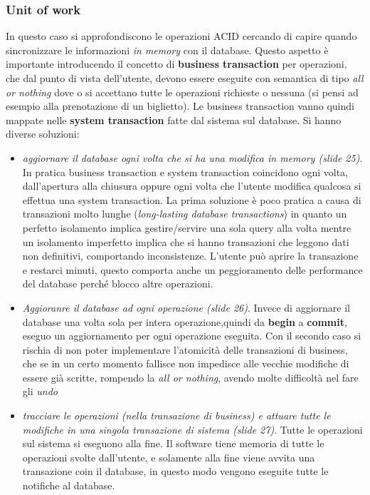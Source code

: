 \subsubsection{Unit of work}
In questo caso si approfondiscono le operazioni ACID cercando di capire quando sincronizzare le informazioni \textit{in memory} con il database. Questo aspetto è importante introducendo il concetto di \textbf{business transaction} per operazioni, che dal punto di vista dell'utente, devono essere eseguite con semantica di tipo \textit{all or nothing} dove o si accettano tutte le operazioni richieste o nessuna (si pensi ad esempio alla prenotazione di un biglietto). Le business transaction vanno quindi mappate nelle \textbf{system transaction} fatte dal sistema sul database. Si hanno diverse soluzioni:
\begin{itemize}
    \item \textit{aggiornare il database ogni volta che si ha una modifica in memory (slide 25)}. In pratica business transaction e system transaction coincidono ogni volta, dall'apertura alla chiusura oppure ogni volta che l'utente modifica qualcosa si effettua una system transaction. La prima soluzione è poco pratica a causa di transazioni molto lunghe (\textit{long-lasting database transactions}) in quanto un perfetto isolamento implica gestire/servire una sola query alla volta mentre un isolamento imperfetto implica che si hanno transazioni che leggono dati non definitivi, comportando inconsistenze. L'utente può aprire la transazione e restarci minuti, questo comporta anche un peggioramento delle performance del database perché blocco altre operazioni.
    \item \textit{Aggioranre il database ad ogni operazione (slide 26)}. Invece di aggiornare il database una volta sola per intera operazione,quindi da \textbf{begin} a \textbf{commit}, eseguo un aggiornamento per ogni operazione eseguita. Con il secondo caso si rischia di non poter implementare l'atomicità delle transazioni di business, che se in un certo momento fallisce non impedisce alle vecchie modifiche di essere già scritte, rompendo la \textit{all or nothing}, avendo molte difficoltà nel fare gli \textit{undo}
    \item \textit{tracciare le operazioni (nella transazione di business) e attuare tutte le modifiche in una singola transazione di sistema (slide 27)}. Tutte le operazioni sul sistema si eseguono alla fine. Il software tiene memoria di tutte le operazioni svolte dall'utente, e solamente alla fine viene avvita una transazione coin il database, in questo modo vengono eseguite tutte le notifiche al database. 
\end{itemize}
